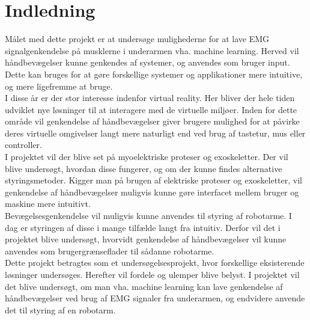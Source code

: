 \thispagestyle{fancy}
\chapter{Indledning}
\label{chp:indledning}
Målet med dette projekt er at undersøge mulighederne for at lave EMG signalgenkendelse på musklerne i underarmen vha. machine learning. Herved vil håndbevægelser kunne genkendes af systemer, og anvendes som bruger input. Dette kan bruges for at gøre forskellige systemer og applikationer mere intuitive, og mere ligefremme at bruge.\\

I disse år er der stor interesse indenfor virtual reality. Her bliver der hele tiden udviklet nye løsninger til at interagere med de virtuelle miljøer. Inden for dette område vil genkendelse af håndbevægelser giver brugere mulighed for at påvirke deres virtuelle omgivelser langt mere naturligt end ved brug af tastetur, mus eller controller.\\

I projektet vil der blive set på myoelektriske proteser og exoskeletter. Der vil blive undersøgt, hvordan disse fungerer, og om der kunne findes alternative styringsmetoder.
Kigger man på brugen af elektriske proteser og exoskeletter, vil genkendelse af håndbevægelser muligvis kunne gøre interfacet mellem bruger og maskine mere intuitivt.\\

Bevægelsesgenkendelse vil muligvis kunne anvendes til styring af robotarme. I dag er styringen af disse i mange tilfælde langt fra intuitiv. Derfor vil det i projektet blive undersøgt, hvorvidt genkendelse af håndbevægelser vil kunne anvendes som brugergrænseflader til sådanne robotarme. \\

Dette projekt betragtes som et undersøgelsesprojekt, hvor forskellige eksisterende løsninger undersøges. Herefter vil fordele og ulemper blive belyst. I projektet vil det blive undersøgt, om man vha. machine learning kan lave genkendelse af håndbevægelser ved brug af EMG signaler fra underarmen, og endvidere anvende det til styring af en robotarm.

%
%
%
%
